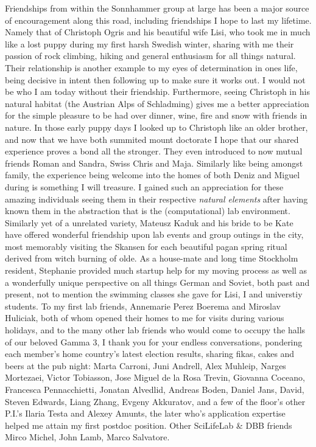 Friendships from within the Sonnhammer group at large has been a major source of encouragement along this road, including friendships I hope to last my lifetime. Namely that of Christoph Ogris and his beautiful wife Lisi, who took me in much like a lost puppy during my first harsh Swedish winter, sharing with me their passion of rock climbing, hiking and general enthusiasm for all things natural. Their relationship is another example to my eyes of determination in ones life, being decisive in intent then following up to make sure it works out. I would not be who I am today without their friendship. Furthermore, seeing Christoph in his natural habitat (the Austrian Alps of Schladming) gives me a better appreciation for the simple pleasure to be had over dinner, wine, fire and snow with friends in nature. In those early puppy days I looked up to Christoph like an older brother, and now that we have both summited mount doctorate I hope that our shared experience proves a bond all the stronger. They even introduced to now mutual friends Roman and Sandra, Swiss Chris and Maja. Similarly like being amongst family, the experience being welcome into the homes of both Deniz and Miguel during is something I will treasure. I gained such an appreciation for these amazing individuals seeing them in their respective \emph{natural elements} after having known them in the abstraction that is the (computational) lab environment. Similarly yet of a unrelated variety, Mateusz Kaduk and his bride to be Kate have offered wonderful friendship upon lab events and group outings in the city, most memorably visiting the Skansen for each beautiful pagan spring ritual derived from witch burning of olde. As a house-mate and long time Stockholm resident, Stephanie provided much startup help for my moving process as well as a wonderfully unique perspective on all things German and Soviet, both past and present, not to mention the swimming classes she gave for Lisi, I and universtiy students.
To my first lab friends, Annemarie Perez Boerema and Miroslav Huliciak, both of whom opened their homes to me for visits during various holidays, and to the many other lab friends who would come to occupy the halls of our beloved Gamma 3, I thank you for your endless conversations, pondering each member's home country's latest election results, sharing fikas, cakes and beers at the pub night: Marta Carroni, Juni Andrell, Alex Muhleip, Narges Mortezaei, Victor Tobiasson, Jose Miguel de la Rosa Trevin, Giovanna Coceano, Francesca Pennacchietti, Jonatan Alvedlid, Andreas Boden, Daniel Jans, David, Steven Edwards, Liang Zhang, Evgeny Akkuratov, and a few of the floor's other P.I.'s Ilaria Testa and Alexey Amunts, the later who's application expertise helped me attain my first postdoc position. Other SciLifeLab \& DBB friends Mirco Michel, John Lamb, Marco Salvatore.
